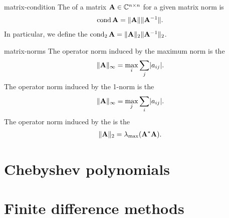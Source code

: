 \begin{Definition}{matrix-condition}
  The  of a matrix $\mathbf A\in\mathbb C^{n\times n}$ for a given
  matrix norm is
  \begin{gather*}
    \operatorname{cond}\mathbf A = \lVert\mathbf A\rVert\lVert\mathbf A^{-1}\rVert.
  \end{gather*}
  In particular, we define the 
 $\operatorname{cond}_2\mathbf A = \lVert\mathbf A\rVert_2\lVert\mathbf A^{-1}\rVert_2$.
\end{Definition}

\begin{Example}{matrix-norms}
  The operator norm induced by the maximum norm is the 
  \begin{gather}
    \lVert\mathbf A\rVert_\infty = \max_i \sum_j \lvert a_{ij}\rvert.
  \end{gather}
  The operator norm induced by the 1-norm is the 
  \begin{gather}
    \lVert\mathbf A\rVert_\infty = \max_j \sum_i \lvert a_{ij}\rvert.
  \end{gather}
  The operator norm induced by the  is the 
  \begin{gather}
    \lVert\mathbf A\rVert_2 = \lambda_{\max}(\mathbf A^*\mathbf A).
  \end{gather}
\end{Example}

\section{Chebyshev polynomials}


\section{Finite difference methods}


\nocite{Rannacher18nla}


\printindex

